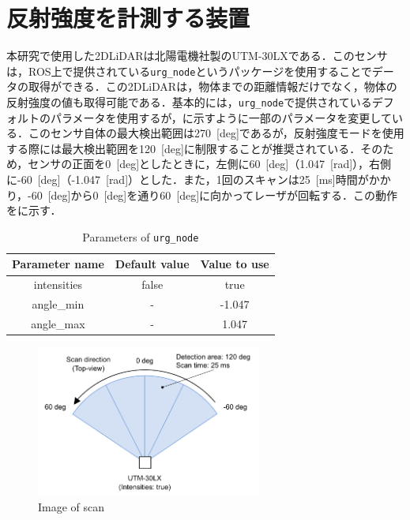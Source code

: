 
\section{反射強度を計測する装置}

  本研究で使用した2DLiDARは北陽電機社製のUTM-30LX\cite{hokuyo}である．このセンサは，ROS上で提供されている\texttt{urg\_node}\cite{urg_node}というパッケージを使用することでデータの取得ができる．この2DLiDARは，物体までの距離情報だけでなく，物体の反射強度の値も取得可能である．基本的には，\texttt{urg\_node}で提供されているデフォルトのパラメータを使用するが，に示すように一部のパラメータを変更している．このセンサ自体の最大検出範囲は270 \,[deg]であるが，反射強度モードを使用する際には最大検出範囲を120 \,[deg]に制限することが推奨されている\cite{urg_node}．そのため，センサの正面を0 \,[deg]としたときに，左側に60 \,[deg]（1.047 \,[rad]），右側に-60 \,[deg]（-1.047 \,[rad]）とした．また，1回のスキャンは25 \,[ms]時間がかかり，-60 \,[deg]から0 \,[deg]を通り60 \,[deg]に向かってレーザが回転する．この動作をに示す．

  \begin{table}[hbtp]
    \caption{Parameters of \texttt{urg\_node}}
    \label{tab:parameters_of_urg_node}
    \centering
    \begin{tabular}{ccc}
    \hline
    Parameter name & Default value & Value to use \\ 
    \hline
    \hline
    intensities & false   & true         \\ 
    angle\_min  & -       & -1.047       \\ 
    angle\_max  & -       & 1.047        \\ 
    \hline
    \end{tabular}
    \end{table}

    \begin{figure}[h]
      \centering
      \includegraphics[height=5cm] {images/pdf/RobotGuidance_hokuyo_scan}
      \captionsetup{justification=raggedright} %
      \caption{Image of scan}
      \label{Fig:Image of scan}
    \end{figure}

\newpage